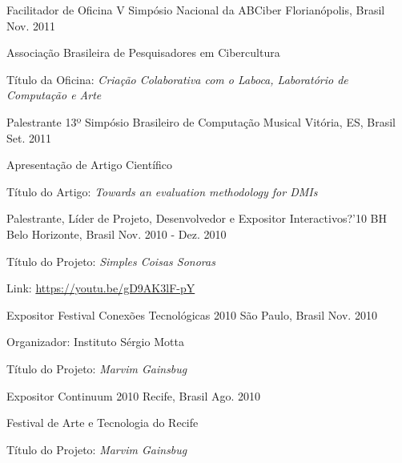 \begin{cventries}
\cventry
	{Facilitador de Oficina}
	{V Simpósio Nacional da ABCiber}
	{Florianópolis, Brasil}
	{Nov. 2011}
	{\begin{cvitems}
		\item{Associação Brasileira de Pesquisadores em Cibercultura}
		\item{Título da Oficina: \textit{Criação Colaborativa com o Laboca, Laboratório de Computação e Arte}}
	\end{cvitems}}

\cventry
	{Palestrante}
	{13º Simpósio Brasileiro de Computação Musical}
	{Vitória, ES, Brasil}
	{Set. 2011}
	{\begin{cvitems}
		\item{Apresentação de Artigo Científico}
		\item{Título do Artigo: \textit{Towards an evaluation methodology for DMIs}}
	\end{cvitems}}

\cventry
	{Palestrante, Líder de Projeto, Desenvolvedor e Expositor}
	{Interactivos?'10 BH}
	{Belo Horizonte, Brasil}
	{Nov. 2010 - Dez. 2010}
	{\begin{cvitems}
		\item{Título do Projeto: \textit{Simples Coisas Sonoras}}
		\item{Link: \href{https://youtu.be/gD9AK3lF-pY}{https://youtu.be/gD9AK3lF-pY}}
	\end{cvitems}}

\cventry
	{Expositor}
	{Festival Conexões Tecnológicas 2010}
	{São Paulo, Brasil}
	{Nov. 2010}
	{\begin{cvitems}
		\item{Organizador: Instituto Sérgio Motta}
		\item{Título do Projeto: \textit{Marvim Gainsbug}}
	\end{cvitems}}

\cventry
	{Expositor}
	{Continuum 2010}
	{Recife, Brasil}
	{Ago. 2010}
	{\begin{cvitems}
		\item{Festival de Arte e Tecnologia do Recife}
		\item{Título do Projeto: \textit{Marvim Gainsbug}}
	\end{cvitems}}


\end{cventries}
